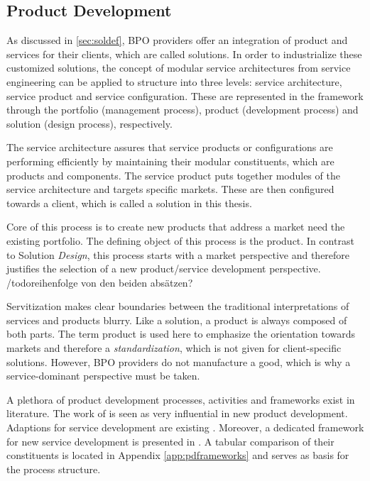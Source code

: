 	\subsection{Product Development}
	\label{sec:proddev}
	
	As discussed in \ref{sec:soldef}, \acrshort{BPO} providers offer an integration of product and services for their clients, which are called solutions. In order to industrialize these customized solutions, the concept of modular service architectures from service engineering \citep{Bohmann2006} can be applied to structure into three levels: service architecture, service product and service configuration. These are represented in the framework through the portfolio (management process), product (development process) and solution (design process), respectively. 
	
	The service architecture assures that service products or configurations are performing efficiently by maintaining their modular constituents, which are products and components. The service product puts together modules of the service architecture and targets specific markets. These are then configured towards a client, which is called a solution in this thesis. 
	
	Core of this process is to create new products that address a market need \wrt the existing portfolio. The defining object of this process is the product. In contrast to Solution \textit{Design}, this process starts with a market perspective and therefore justifies the selection of a new product/service development perspective.  /todo{reihenfolge von den beiden absätzen?}
	
	Servitization makes clear boundaries between the traditional interpretations of services and products blurry. Like a solution, a product is always composed of both parts. The term product is used here to emphasize the orientation towards markets and therefore a \textit{standardization}, which is not given for client-specific solutions. However, \acrshort{BPO} providers do not manufacture a good, which is why a service-dominant perspective must be taken.  
	
	A plethora of product development processes, activities and frameworks exist in literature. The work of  \cite{cooper1988new} is seen as very influential in new product development. Adaptions for service development are existing \citep{Edgett_1996}. Moreover, a dedicated framework for new service development is presented in \citep{cowell1988new}. A tabular comparison of their constituents is located in Appendix \ref{app:pdframeworks} and serves as basis for the process structure. 
	

